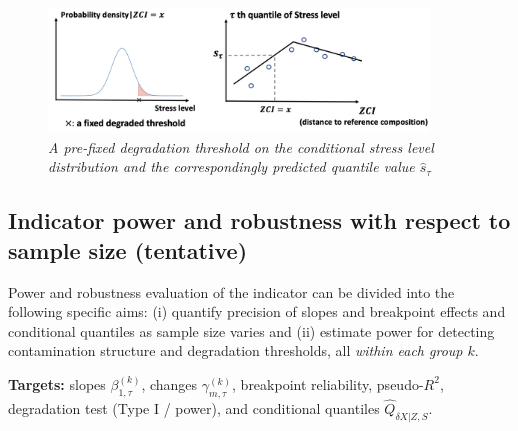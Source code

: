 \begin{figure}[!h]
\centering
\includegraphics[width=0.9\textwidth]{../presentation/figures/p16_degraded_threshold_and_quantile_regression.png}
\caption{\textit{A pre-fixed degradation threshold on the conditional stress level distribution and the correspondingly predicted quantile value \(\hat s_{\tau}\)}}
\label{fig:p16_degraded_threshold_and_quantile_regression}
\end{figure}


\subsection{Indicator power and robustness with respect to sample size (tentative)}
Power and robustness evaluation of the indicator can be divided into the following specific aims: 
(i) quantify precision of slopes and breakpoint effects and conditional quantiles as sample size varies 
and (ii) estimate power for detecting contamination structure and degradation thresholds, all \emph{within each group $k$}.

	\textbf{Targets:} slopes $\beta_{1,\tau}^{(k)}$, changes $\gamma_{m,\tau}^{(k)}$, breakpoint reliability, pseudo-$R^2$, degradation test (Type I / power), and conditional quantiles $\widehat Q_{\delta X|Z,S}$.

